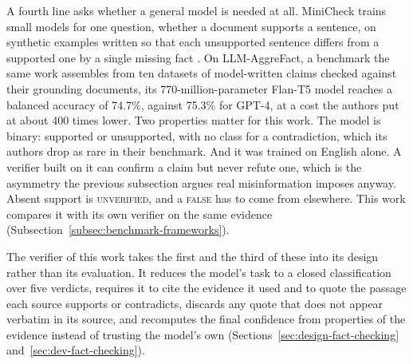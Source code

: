 A fourth line asks whether a general model is needed at all.
MiniCheck trains small models for one question, whether a document
supports a sentence, on synthetic examples written so that each
unsupported sentence differs from a supported one by a single missing
fact \cite{tang2024minicheck}. On LLM-AggreFact, a benchmark the same
work assembles from ten datasets of model-written claims checked against
their grounding documents, its 770-million-parameter Flan-T5 model
reaches a balanced accuracy of 74.7\%, against 75.3\% for GPT-4, at a
cost the authors put at about 400 times lower. Two properties matter for
this work. The model is binary: supported or unsupported, with no class
for a contradiction, which its authors drop as rare in their benchmark.
And it was trained on English alone. A verifier built on it can confirm a
claim but never refute one, which is the asymmetry the previous
subsection argues real misinformation imposes anyway. Absent support is
\textsc{unverified}, and a \textsc{false} has to come from elsewhere.
This work compares it with its own verifier on the same evidence
(Subsection~\ref{subsec:benchmark-frameworks}).

The verifier of this work takes the first and the third of these into
its design rather than its evaluation. It reduces the model's task to
a closed classification over five verdicts, requires it to cite the
evidence it used and to quote the passage each source supports or
contradicts, discards any quote that does not appear verbatim in its
source, and recomputes the final confidence from properties of the
evidence instead of trusting the model's own
(Sections~\ref{sec:design-fact-checking} and~\ref{sec:dev-fact-checking}).
